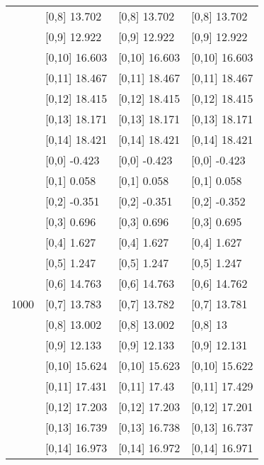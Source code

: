 \begin{table}
\begin{tabular}[t]{llll}
 & {}[0,8] 13.702 & {}[0,8] 13.702 & {}[0,8] 13.702\\
 & {}[0,9] 12.922 & {}[0,9] 12.922 & {}[0,9] 12.922\\
\addlinespace
 & {}[0,10] 16.603 & {}[0,10] 16.603 & {}[0,10] 16.603\\
 & {}[0,11] 18.467 & {}[0,11] 18.467 & {}[0,11] 18.467\\
 & {}[0,12] 18.415 & {}[0,12] 18.415 & {}[0,12] 18.415\\
 & {}[0,13] 18.171 & {}[0,13] 18.171 & {}[0,13] 18.171\\
 & {}[0,14] 18.421 & {}[0,14] 18.421 & {}[0,14] 18.421\\
\addlinespace
 & {}[0,0] -0.423 & {}[0,0] -0.423 & {}[0,0] -0.423\\
 & {}[0,1] 0.058 & {}[0,1] 0.058 & {}[0,1] 0.058\\
 & {}[0,2] -0.351 & {}[0,2] -0.351 & {}[0,2] -0.352\\
 & {}[0,3] 0.696 & {}[0,3] 0.696 & {}[0,3] 0.695\\
 & {}[0,4] 1.627 & {}[0,4] 1.627 & {}[0,4] 1.627\\
\addlinespace
 & {}[0,5] 1.247 & {}[0,5] 1.247 & {}[0,5] 1.247\\
 & {}[0,6] 14.763 & {}[0,6] 14.763 & {}[0,6] 14.762\\
1000 & {}[0,7] 13.783 & {}[0,7] 13.782 & {}[0,7] 13.781\\
 & {}[0,8] 13.002 & {}[0,8] 13.002 & {}[0,8] 13\\
 & {}[0,9] 12.133 & {}[0,9] 12.133 & {}[0,9] 12.131\\
\addlinespace
 & {}[0,10] 15.624 & {}[0,10] 15.623 & {}[0,10] 15.622\\
 & {}[0,11] 17.431 & {}[0,11] 17.43 & {}[0,11] 17.429\\
 & {}[0,12] 17.203 & {}[0,12] 17.203 & {}[0,12] 17.201\\
 & {}[0,13] 16.739 & {}[0,13] 16.738 & {}[0,13] 16.737\\
 & {}[0,14] 16.973 & {}[0,14] 16.972 & {}[0,14] 16.971\\
\bottomrule
\end{tabular}
\end{table}
